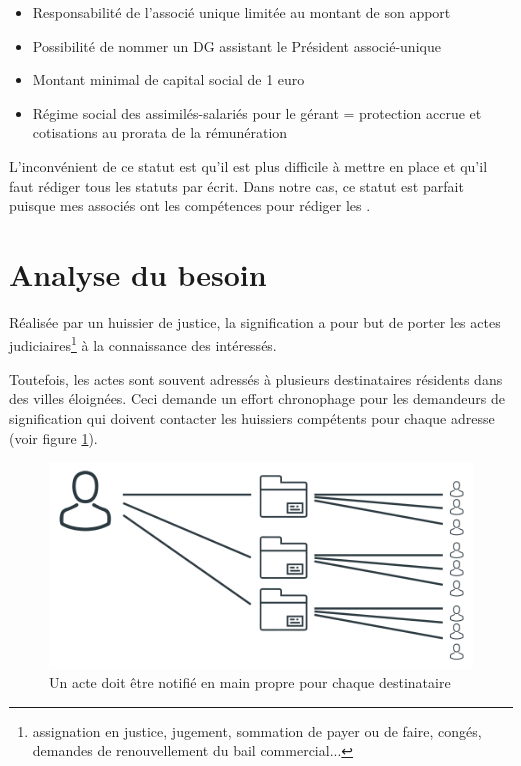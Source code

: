 \documentclass[]{report}
\begin{document}
    \begin{itemize}
      \item Responsabilité de l'associé unique limitée au montant de son apport
      \item Possibilité de nommer un DG assistant le Président associé-unique
      \item Montant minimal de capital social de 1 euro
      \item Régime social des assimilés-salariés pour le gérant = protection accrue et cotisations au prorata de la rémunération
    \end{itemize}

    L'inconvénient de ce statut est qu'il est plus difficile à mettre en place et qu'il faut rédiger tous les statuts par écrit. Dans notre cas, ce statut est parfait puisque mes associés ont les compétences pour rédiger les .

  \section{Analyse du besoin}


    Réalisée par un huissier de justice, la signification a pour but de porter les actes judiciaires\footnote{assignation en justice, jugement, sommation de payer ou de faire, congés, demandes de renouvellement du bail commercial...} à la connaissance des intéressés. 

    Toutefois, les actes sont souvent adressés à plusieurs destinataires résidents dans des villes éloignées. Ceci demande un effort chronophage pour les demandeurs de signification qui doivent contacter les huissiers compétents pour chaque adresse (voir figure \ref{fig:signification_before}).

    \begin{figure}[h!]
      \includegraphics[width=\linewidth]{img/signification_before.png}
      \caption{Un acte doit être notifié en main propre pour chaque destinataire}
      \label{fig:signification_before}
    \end{figure}
\end{document}
